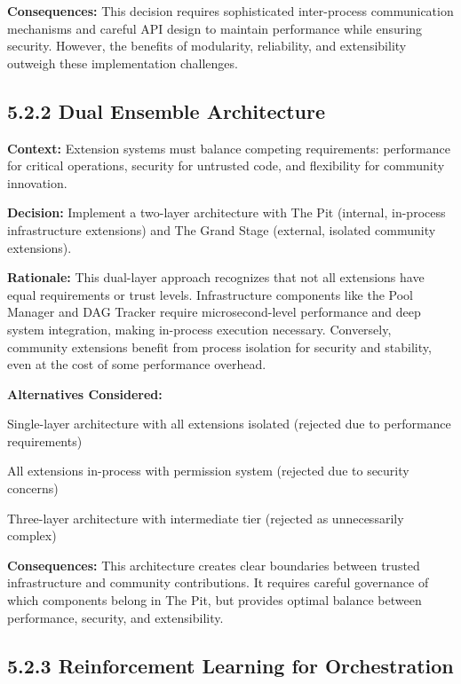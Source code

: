 \textbf{Consequences:} This decision requires sophisticated inter-process communication mechanisms and careful API design to maintain performance while ensuring security. However, the benefits of modularity, reliability, and extensibility outweigh these implementation challenges.

\subsection*{5.2.2 Dual Ensemble Architecture}

\textbf{Context:} Extension systems must balance competing requirements: performance for critical operations, security for untrusted code, and flexibility for community innovation.

\textbf{Decision:} Implement a two-layer architecture with The Pit (internal, in-process infrastructure extensions) and The Grand Stage (external, isolated community extensions).

\textbf{Rationale:} This dual-layer approach recognizes that not all extensions have equal requirements or trust levels. Infrastructure components like the Pool Manager and DAG Tracker require microsecond-level performance and deep system integration, making in-process execution necessary. Conversely, community extensions benefit from process isolation for security and stability, even at the cost of some performance overhead.

\textbf{Alternatives Considered:}
\begin{compactlist}
    \item Single-layer architecture with all extensions isolated (rejected due to performance requirements)
    \item All extensions in-process with permission system (rejected due to security concerns)
    \item Three-layer architecture with intermediate tier (rejected as unnecessarily complex)
\end{compactlist}

\textbf{Consequences:} This architecture creates clear boundaries between trusted infrastructure and community contributions. It requires careful governance of which components belong in The Pit, but provides optimal balance between performance, security, and extensibility.

\subsection*{5.2.3 Reinforcement Learning for Orchestration}

